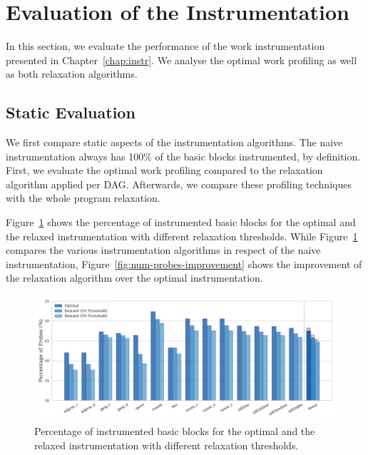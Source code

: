 \section{Evaluation of the Instrumentation}

In this section, we evaluate the performance of the work instrumentation presented in Chapter~\ref{chap:instr}.
We analyse the optimal work profiling as well as both relaxation algorithms.

\subsection{Static Evaluation}

We first compare static aspects of the instrumentation algorithms.
The naive instrumentation always has 100\% of the basic blocks instrumented, by definition.
First, we evaluate the optimal work profiling compared to the relaxation algorithm applied per DAG.
Afterwards, we compare these profiling techniques with the whole program relaxation.

Figure~\ref{fig:num-probes} shows the percentage of instrumented basic blocks for the optimal and the relaxed instrumentation with different relaxation thresholds.
While Figure~\ref{fig:num-probes} compares the various instrumentation algorithms in respect of the naive instrumentation, Figure~\ref{fig:num-probes-improvement} shows the improvement of the relaxation algorithm  over the optimal instrumentation.

\begin{figure}[ht]
    \centering
    \includegraphics[width=\textwidth]{figs/num-probes.pdf}
    \caption{Percentage of instrumented basic blocks for the optimal and the relaxed instrumentation with different relaxation thresholds.}
    \label{fig:num-probes}
\end{figure}

